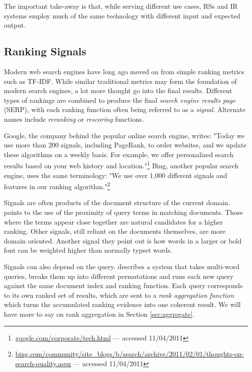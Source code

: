 The important take-away is that, while serving different use cases, RSs and IR systems 
employ much of the same technology with different input and expected output.


\subsection{Ranking Signals}

Modern web search engines have long ago moved on from simple ranking metrics such as TF-IDF.
While similar traditional metrics may form the foundation of modern search engines, a lot more thought go into the final results.
Different types of rankings are combined to produce the final \emph{search engine results page} (SERP),
with each ranking function often being referred to as a \emph{signal}. Alternate names include
\emph{reranking} or \emph{rescoring} functions.

Google, the company behind the popular online search engine, writes: "Today we use more than 200 signals, including PageRank, 
to order websites, and we update these algorithms on a weekly basis. 
For example, we offer personalized search results based on your web history and 
location."\footnote{\url{google.com/corporate/tech.html} --- accessed 11/04/2011}
Bing, another popular search engine, uses the same terminology:
"We use over 1,000 different signals and features in our ranking 
algorithm."\footnote{\url{bing.com/community/site_blogs/b/search/archive/2011/02/01/thoughts-on-search-quality.aspx} --- accessed 11/04/2011}

Signals are often products of the document structure of the current domain.
\citet[p5]{Bender2005} points to the use of the proximity of query terms in matching documents.
Those where the terms appear close together are natural candidates for a higher ranking.
Other signals, still reliant on the documents themselves, are more domain oriented.
Another signal they point out is how words in a larger or bold font can be weighted 
higher than normally typset words.

Signals can also depend on the query. \citet[p145]{Manning2008} describes a system that takes
multi-word queries, breaks them up into different permutations and runs each new query against the same
document index and ranking function. Each query corresponds to its own ranked set of results,
which are sent to a \emph{rank aggregation function} which turns the accumulated ranking evidence
into one coherent result. We will have more to say on rank aggregation in Section \ref{sec:aggregate}.  

